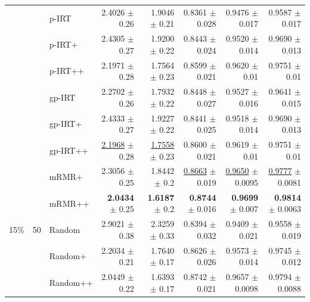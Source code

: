 \begin{longtable}{llp{}rrrrr}
 &  & p-IRT & 2.4026 {\scriptsize $\pm$ 0.26} & 1.9046 {\scriptsize $\pm$ 0.21} & 0.8361 {\scriptsize $\pm$ 0.028} & 0.9476 {\scriptsize $\pm$ 0.017} & 0.9587 {\scriptsize $\pm$ 0.017} \\
 &  & p-IRT+ & 2.4305 {\scriptsize $\pm$ 0.27} & 1.9200 {\scriptsize $\pm$ 0.22} & 0.8443 {\scriptsize $\pm$ 0.024} & 0.9520 {\scriptsize $\pm$ 0.014} & 0.9690 {\scriptsize $\pm$ 0.013} \\
 &  & p-IRT++ & 2.1971 {\scriptsize $\pm$ 0.28} & 1.7564 {\scriptsize $\pm$ 0.23} & 0.8599 {\scriptsize $\pm$ 0.021} & 0.9620 {\scriptsize $\pm$ 0.01} & 0.9751 {\scriptsize $\pm$ 0.01} \\
 &  & gp-IRT & 2.2702 {\scriptsize $\pm$ 0.26} & 1.7932 {\scriptsize $\pm$ 0.22} & 0.8448 {\scriptsize $\pm$ 0.027} & 0.9527 {\scriptsize $\pm$ 0.016} & 0.9641 {\scriptsize $\pm$ 0.015} \\
 &  & gp-IRT+ & 2.4333 {\scriptsize $\pm$ 0.27} & 1.9227 {\scriptsize $\pm$ 0.22} & 0.8441 {\scriptsize $\pm$ 0.025} & 0.9518 {\scriptsize $\pm$ 0.014} & 0.9690 {\scriptsize $\pm$ 0.013} \\
 &  & gp-IRT++ & \underline{2.1968} {\scriptsize $\pm$ 0.28} & \underline{1.7558} {\scriptsize $\pm$ 0.23} & 0.8600 {\scriptsize $\pm$ 0.021} & 0.9619 {\scriptsize $\pm$ 0.01} & 0.9751 {\scriptsize $\pm$ 0.01} \\
 &  & mRMR+ & 2.3056 {\scriptsize $\pm$ 0.25} & 1.8442 {\scriptsize $\pm$ 0.2} & \underline{0.8663} {\scriptsize $\pm$ 0.019} & \underline{0.9650} {\scriptsize $\pm$ 0.0095} & \underline{0.9777} {\scriptsize $\pm$ 0.0081} \\
 &  & mRMR++ & \textbf{2.0434} {\scriptsize $\pm$ 0.25} & \textbf{1.6187} {\scriptsize $\pm$ 0.2} & \textbf{0.8744} {\scriptsize $\pm$ 0.016} & \textbf{0.9699} {\scriptsize $\pm$ 0.007} & \textbf{0.9814} {\scriptsize $\pm$ 0.0063} \\
\midrule
15\% & 50 & Random & 2.9021 {\scriptsize $\pm$ 0.38} & 2.3259 {\scriptsize $\pm$ 0.33} & 0.8394 {\scriptsize $\pm$ 0.032} & 0.9409 {\scriptsize $\pm$ 0.021} & 0.9558 {\scriptsize $\pm$ 0.019} \\
 &  & Random+ & 2.2034 {\scriptsize $\pm$ 0.21} & 1.7640 {\scriptsize $\pm$ 0.17} & 0.8626 {\scriptsize $\pm$ 0.026} & 0.9573 {\scriptsize $\pm$ 0.014} & 0.9745 {\scriptsize $\pm$ 0.012} \\
 &  & Random++ & 2.0449 {\scriptsize $\pm$ 0.22} & 1.6393 {\scriptsize $\pm$ 0.17} & 0.8742 {\scriptsize $\pm$ 0.021} & 0.9657 {\scriptsize $\pm$ 0.0098} & 0.9794 {\scriptsize $\pm$ 0.0088} \\

\end{longtable}
